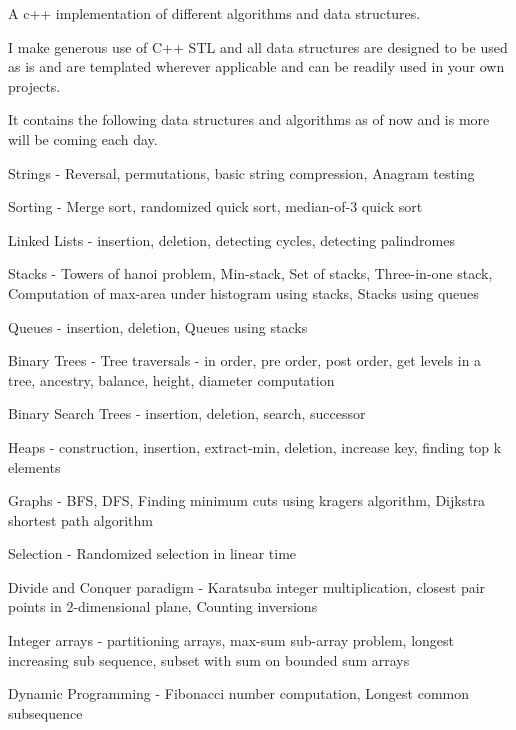A c++ implementation of different algorithms and data structures.

I make generous use of C++ S\-T\-L and all data structures are designed to be used as is and are templated wherever applicable and can be readily used in your own projects.

It contains the following data structures and algorithms as of now and is more will be coming each day.


\begin{DoxyItemize}
\item Strings -\/ Reversal, permutations, basic string compression, Anagram testing
\item Sorting -\/ Merge sort, randomized quick sort, median-\/of-\/3 quick sort
\item Linked Lists -\/ insertion, deletion, detecting cycles, detecting palindromes
\item Stacks -\/ Towers of hanoi problem, Min-\/stack, Set of stacks, Three-\/in-\/one stack, Computation of max-\/area under histogram using stacks, Stacks using queues
\item Queues -\/ insertion, deletion, Queues using stacks
\item Binary Trees -\/ Tree traversals -\/ in order, pre order, post order, get levels in a tree, ancestry, balance, height, diameter computation
\item Binary Search Trees -\/ insertion, deletion, search, successor
\item Heaps -\/ construction, insertion, extract-\/min, deletion, increase key, finding top k elements
\item Graphs -\/ B\-F\-S, D\-F\-S, Finding minimum cuts using kragers algorithm, Dijkstra shortest path algorithm
\item Selection -\/ Randomized selection in linear time
\item Divide and Conquer paradigm -\/ Karatsuba integer multiplication, closest pair points in 2-\/dimensional plane, Counting inversions
\item Integer arrays -\/ partitioning arrays, max-\/sum sub-\/array problem, longest increasing sub sequence, subset with sum on bounded sum arrays
\item Dynamic Programming -\/ Fibonacci number computation, Longest common subsequence 
\end{DoxyItemize}